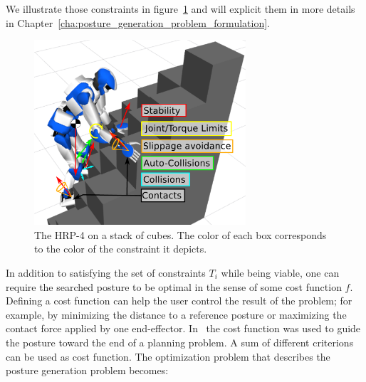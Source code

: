 We illustrate those constraints in figure~\ref{fig:PG} and will explicit them in more details in Chapter~\ref{cha:posture_generation_problem_formulation}.


\begin{figure}[ht]
  \centering
  \includegraphics[width=0.7\textwidth]{PG.pdf}
  \caption{The HRP-4 on a stack of cubes. The color of each box corresponds to the color of the constraint it depicts.}
\label{fig:PG}
\end{figure}

In addition to satisfying the set of constraints $T_i$ while being viable, one can require the searched posture to be optimal in the sense of some cost function $f$.
Defining a cost function can help the user control the result of the problem; for example, by minimizing the distance to a reference posture or maximizing the contact force applied by one end-effector.
In~\cite{escande2009} the cost function was used to guide the posture toward the end of a planning problem.
A sum of different criterions can be used as cost function.
The optimization problem that describes the posture generation problem becomes:



